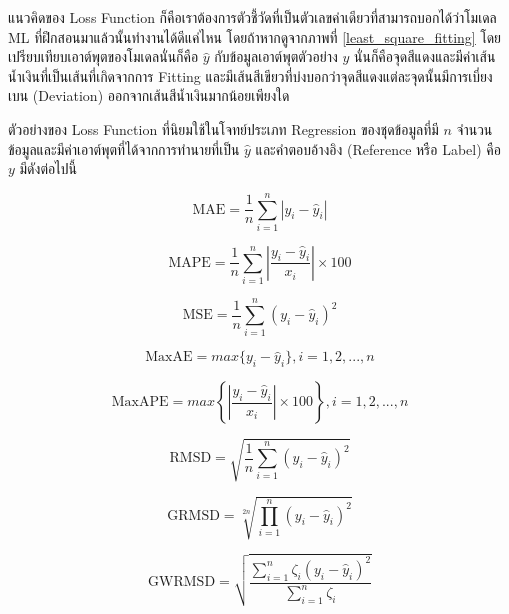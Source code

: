 แนวคิดของ Loss Function ก็คือเราต้องการตัวชี้วัดที่เป็นตัวเลขค่าเดียวที่สามารถบอกได้ว่าโมเดล ML ที่ฝึกสอนมาแล้วนั้นทำงานได้ดีแค่ไหน 
โดยถ้าหากดูจากภาพที่ \ref{least_square_fitting} โดยเปรียบเทียบเอาต์พุตของโมเดลนั่นก็คือ $\hat{y}$ กับข้อมูลเอาต์พุตตัวอย่าง $y$ 
นั่นก็คือจุดสีแดงและมีค่าเส้นน้ำเงินที่เป็นเส้นที่เกิดจากการ Fitting และมีเส้นสีเขียวที่บ่งบอกว่าจุดสีแดงแต่ละจุดนั้นมีการเบี่ยงเบน (Deviation) 
ออกจากเส้นสีน้ำเงินมากน้อยเพียงใด

ตัวอย่างของ Loss Function ที่นิยมใช้ในโจทย์ประเภท Regression ของชุดข้อมูลที่มี $n$ จำนวนข้อมูลและมีค่าเอาต์พุตที่ได้จากการทำนายที่เป็น 
$\hat{y}$ และคำตอบอ้างอิง (Reference หรือ Label) คือ $y$ มีดังต่อไปนี้

\begin{equation}\label{eq:mae}
    \text{MAE} = \frac{1}{n} \sum_{i=1}^{n} | y_{i} - \hat{y}_{i} |
\end{equation}

\begin{equation}\label{eq:mape}
    \text{MAPE} = \frac{1}{n} \sum_{i=1}^{n} \left| \frac{y_{i} - \hat{y}_{i}}{x_{i}} \right| \times 100
\end{equation}

\begin{equation}\label{eq:mse}
    \text{MSE} = \frac{1}{n} \sum_{i=1}^{n} \left( y_{i} - \hat{y}_{i} \right)^2
\end{equation}

\begin{equation}\label{eq:maxae}
    \text{MaxAE} = max\{y_{i} - \hat{y}_{i}\}, i = 1, 2, ..., n
\end{equation}

\begin{equation}\label{eq:maxape}
    \text{MaxAPE} = max\left\{\left| \frac{y_{i} - \hat{y}_{i}}{x_{i}} \right| \times 100 \right\}, i = 1, 2, 
    ..., n
\end{equation}

\begin{equation}\label{eq:rmsd}
    \text{RMSD} = \sqrt{ \frac{1}{n} \sum_{i=1}^{n} (y_{i} - \hat{y}_{i})^{2} }
\end{equation}

\begin{equation}\label{eq:grmsd}
    \text{GRMSD} = \sqrt[2n]{ \prod_{i=1}^{n} (y_{i} - \hat{y}_{i})^{2} }
\end{equation}

\begin{equation}\label{eq:gwrmsd}
    \text{GWRMSD} = \sqrt{\frac{\sum_{i=1}^{n} \zeta_{i} (y_{i} - \hat{y}_{i})^{2}}{\sum_{i=1}^{n} \zeta_{i}}}
\end{equation}

